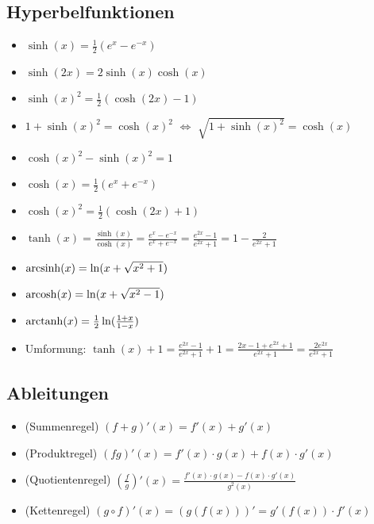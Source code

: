 \subsection{Hyperbelfunktionen}
\begin{itemize}[leftmargin=*]
	\item $\sinh(x) = \frac{1}{2}(e^x - e^{-x})$
	\item $\sinh(2x) = 2 \sinh(x) \cosh(x)$
	\item $\sinh(x)^2 = \frac{1}{2} (\cosh(2x) - 1)$
	\item $1 + \sinh(x)^2 = \cosh(x)^2$ $\Leftrightarrow$ $\sqrt{1 + \sinh(x)^2} = \cosh(x)$
	\item $\cosh(x)^2 - \sinh(x)^2 = 1$
	\item $\cosh(x) = \frac{1}{2}(e^x + e^{-x})$
	\item $\cosh(x)^2 = \frac{1}{2} (\cosh(2x) + 1)$
	\item $\tanh(x) = \frac{\sinh(x)}{\cosh(x)} = \frac{e^x - e^{-x}}{e^x +
	e^{-x}} = \frac{e^{2x} - 1}{e^{2x} + 1} = 1 - \frac{2}{e^{2x} + 1}$
	\item $\operatorname{arcsinh}(x) = \ln(x + \sqrt{x^2 + 1})$
	\item $\operatorname{arcosh}(x) = \ln(x + \sqrt{x^2 - 1})$
	\item $\operatorname{arctanh}(x) = \frac{1}{2} \ln(\frac{1+x}{1-x})$
	\item Umformung: $\tanh(x) + 1 = \frac{e^{2x} - 1}{e^{2x} + 1} + 1 = \frac{2x -
	1 + e^{2x} + 1}{e^{2x} + 1} = \frac{2e^{2x}}{e^{2x} + 1}$
\end{itemize}


\subsection{Ableitungen}
{\small
\begin{itemize}[leftmargin=*]
	\item (Summenregel) $(f + g)'(x) = f'(x) + g'(x)$
	\item (Produktregel) $(fg)'(x) = f'(x) \cdot g(x) + f(x) \cdot g'(x)$
	\item (Quotientenregel) $(\frac{f}{g})'(x) = \frac{f'(x) \cdot g(x) -
	f(x) \cdot g'(x)}{g^2(x)}$
	\item (Kettenregel) $(g \circ f)'(x) = (g(f(x)))' = g'(f(x)) \cdot f'(x)$
\end{itemize}}


